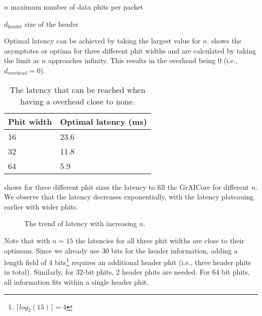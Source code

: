 \begin{eqexpl}[15mm]
    \item{$n$} maximum number of data phits per packet
    \item{$d_{\text{header}}$} size of the header
\end{eqexpl}

Optimal latency can be achieved by taking the largest value for $n$.
 shows the asymptotes or optima for three different phit widths and are calculated by taking the limit as $n$ approaches infinity.
This results in the overhead being $0$ (i.e., $d_{\text{overhead}} = 0$).

\begin{table}[hbtp]
\centering
\begin{tabular}{@{}ll@{}}
\toprule
\textbf{Phit width} & \textbf{Optimal latency (ms)} \\ \midrule
16        & 23.6                  \\
32        & 11.8                  \\
64        & 5.9                   \\ \bottomrule
\end{tabular}
\caption{The latency that can be reached when having a overhead close to none.}
\label{tab:length_field_optimal_latency}
\end{table}

 shows for three different phit sizes the latency to fill the GrAICore for different $n$.
We observe that the latency decreases exponentially, with the latency plateauing earlier with wider phits.

\begin{figure}
    \centering
    
    \caption{The trend of latency with increasing $n$.}
    \label{fig:n_vs_latency}
\end{figure}

Note that with $n=15$ the latencies for all three phit widths are close to their optimum.
Since we already use 30 bits for the header information, adding a length field of 4 bits\footnote{$\lceil log_{2}( 15 )\rceil = 4$} requires an additional header phit (i.e., three header phits in total). Similarly, for 32-bit phits, 2 header phits are needed. For 64 bit phits, all information fits within a single header phit.

